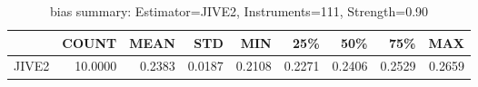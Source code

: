 \begin{table}[ht]
\centering
\caption{bias summary: Estimator=JIVE2, Instruments=111, Strength=0.90}
\begin{tabular}{lrrrrrrrr}
\toprule
 & COUNT & MEAN & STD & MIN & 25\% & 50\% & 75\% & MAX \\
\midrule
JIVE2 & 10.0000 & 0.2383 & 0.0187 & 0.2108 & 0.2271 & 0.2406 & 0.2529 & 0.2659 \\
\bottomrule
\end{tabular}
\end{table}
